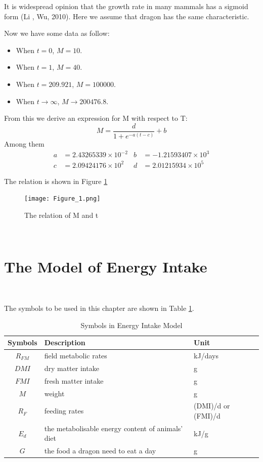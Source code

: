 \documentclass{mcmthesis}
\begin{document}
It is widespread opinion that the growth rate in many mammals has a sigmoid form (Li , Wu, 2010).
Here we assume that dragon has the same characteristic.

Now we have some data as follow:
\begin{itemize}
    \item When $t=0$, $M=10$.
    \item When $t=1$, $M=40$.
    \item When $t=209.921$, $M=100000$.
    \item When $t\rightarrow \infty $, $M\rightarrow 200476.8$.
\end{itemize}

From this we derive an expression for M with respect to T:
\begin{equation}
    M=\frac{d}{1+e^{-a(t-c)}}+b
\end{equation}
Among them
\begin{align*}
a&=2.43265339\times10^{-2} & b&=-1.21593407\times10^{3}\\
c&=2.09424176\times10^{2} & d&=2.01215934\times10^{5}
\end{align*}

The relation is shown in Figure \ref{Figure_1}
\begin{figure}[!htbp]
\centering
\texttt{[image: Figure\_1.png]}
\caption{The relation of M and t}\label{Figure_1}
\end{figure}

~\ \
\section{The Model of Energy Intake}
~\ \

The symbols to be used in this chapter are shown in Table \ref{tb:Variables2}.
\begin{table}[h]
\centering
\caption{Symbols in Energy Intake Model}
\begin{tabular}{cll}
\toprule
\textbf{Symbols}   & \textbf{Description}                                &\textbf{Unit}   \\
\midrule
$R_{FM}$           & field metabolic rates                               &kJ/days             \\
$DMI$              & dry matter intake                                   &g                   \\
$FMI$              & fresh matter intake                                 &g                   \\
$M$                & weight                                              &g                   \\
$R_{F}$            & feeding rates                                       &(DMI)/d or (FMI)/d  \\
$E_{d}$            & the metabolisable energy content of animals' diet   &kJ/g                \\
$G$                & the food a dragon need to eat a day                 &g                   \\
\bottomrule
\end{tabular}\label{tb:Variables2}
\end{table}
\end{document}
